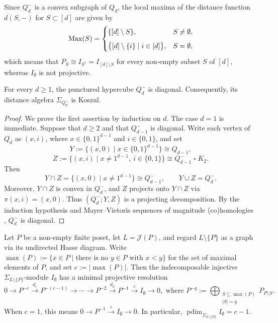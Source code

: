 \documentclass[a4paper,leqno]{amsart}
\begin{document}
Since $Q_d^-$ is a convex subgraph of $Q_d$, the local maxima of the distance function \(d(S,-)\) for $S\subset[d]$ are given by
\[
\operatorname{Max}(S)=
\begin{cases}
\{[d]\setminus S\}, & S\neq\emptyset,\\[2mm]
\bigl\{[d]\setminus\{i\}\mid i\in[d]\bigr\},
& S=\emptyset,
\end{cases}
\]
which means that $P_S \cong I_{S^{\mathrm{c}}} = I_{[d]\setminus S}$ for every non-empty subset $S$ of $[d]$, whereas \(I_{\emptyset}\) is not projective.

\begin{prop}\label{prop:punctured-cube-koszul}
For every $d\geq 1$, the punctured hypercube $Q_d^{-}$ is diagonal.
Consequently, its distance algebra $\Sigma_{Q_d^{-}}$ is Koszul.
\end{prop}

\begin{proof}
We prove the first assertion by induction on $d$. The case $d=1$ is
immediate. Suppose that $d\geq 2$ and that $Q_{d-1}^{-}$ is diagonal.
Write each vertex of $Q_d$ as $(x,i)$, where
$x\in\{0,1\}^{d-1}$ and $i\in\{0,1\}$, and set
\[
Y:=\{(x,0)\mid x\in\{0,1\}^{d-1}\}\cong Q_{d-1},
\]
\[
Z:=\{(x,i)\mid x\neq 1^{d-1},\ i\in\{0,1\}\}
\cong Q_{d-1}^{-}\mathbin{\square}K_2.
\]
Then
\[
Y\cap Z
=\{(x,0)\mid x\neq 1^{d-1}\}
\cong Q_{d-1}^{-},
\qquad
Y\cup Z=Q_d^{-}.
\]
Moreover, $Y\cap Z$ is convex in $Q_d^{-}$, and $Z$ projects onto
$Y\cap Z$ via $\pi(x,i)=(x,0)$. Thus $(Q_d^{-};Y,Z)$ is a projecting decomposition. By the induction hypothesis and Mayer--Vietoris sequences of magnitude (co)homologies \cite[Theorem~6.6]{HW17}, $Q_{d}^{-}$ is diagonal.
\end{proof}

\begin{prop}\label{prop:punctured-distributive-resolution}
Let $P$ be a non-empty finite poset, let $L=\mathcal J(P)$, and regard $L\setminus\{P\}$ as a graph via its undirected Hasse diagram.  Write $\max(P):=\{x\in P\mid \text{there is no $y\in P$ with $x<y$}\}$ for the set of maximal elements of $P$, and set $c:=|\max(P)|$.  Then the indecomposable injective $\Sigma_{L\setminus\{P\}}$-module $I_{\emptyset}$ has a minimal projective resolution
\[
0\longrightarrow P^{-c}\xrightarrow{d_c}P^{-(c-1)}
\longrightarrow\cdots\longrightarrow
P^{-2}\xrightarrow{d_2}P^{-1}
\xrightarrow{\varepsilon}I_{\emptyset}
\longrightarrow0, \text{ where }
P^{-q}:=\bigoplus_{\substack{S\subseteq\max(P)\\|S|=q}} P_{P\setminus S}.
\]
When $c=1$, this means $0\to P^{-1}\xrightarrow{\varepsilon}I_{\emptyset}\to0$.  In particular, $\operatorname{pdim}_{\Sigma_{L\setminus\{P\}}}I_{\emptyset}=c-1$.
\end{prop}
\end{document}
